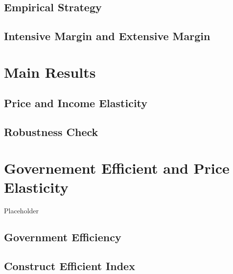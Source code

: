 \documentclass[ review  , 3p ]{elsarticle}
\begin{document}
  \hypertarget{empirical-strategy}{%
  \subsection{Empirical Strategy}\label{empirical-strategy}}
  
  \hypertarget{intensive-margin-and-extensive-margin}{%
  \subsection{Intensive Margin and Extensive Margin}\label{intensive-margin-and-extensive-margin}}
  
  \hypertarget{main-results}{%
  \section{Main Results}\label{main-results}}
  
  \hypertarget{price-and-income-elasticity}{%
  \subsection{Price and Income Elasticity}\label{price-and-income-elasticity}}
  
  \hypertarget{robustness-check}{%
  \subsection{Robustness Check}\label{robustness-check}}
  
  \hypertarget{governement-efficient-and-price-elasticity}{%
  \section{Governement Efficient and Price Elasticity}\label{governement-efficient-and-price-elasticity}}
  
  Placeholder
  
  \hypertarget{government-efficiency}{%
  \subsection{Government Efficiency}\label{government-efficiency}}
  
  \hypertarget{construct-efficient-index}{%
  \subsection{Construct Efficient Index}\label{construct-efficient-index}}
  
\end{document}
